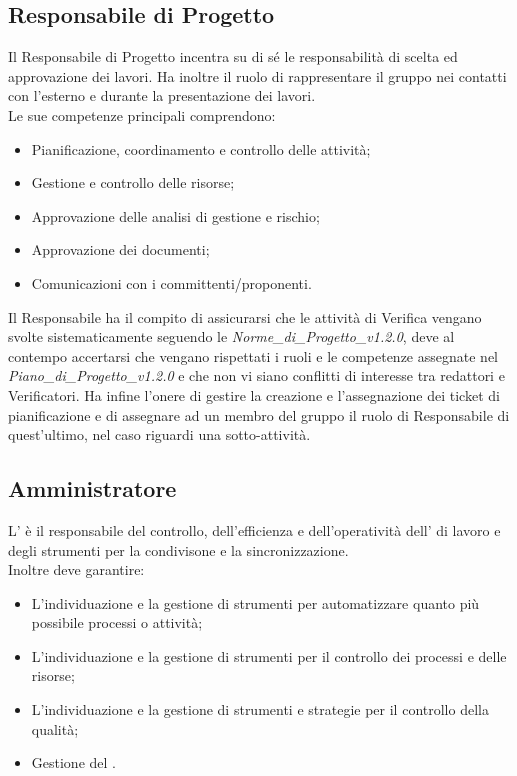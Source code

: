 \subsection{Responsabile di Progetto} %
\label{2.1}
Il Responsabile di Progetto incentra su di sé le responsabilità di scelta ed approvazione dei lavori. Ha inoltre il ruolo di rappresentare il gruppo nei contatti con l'esterno e durante la presentazione dei lavori.\\
Le sue competenze principali comprendono:
\begin{itemize}
\item Pianificazione, coordinamento e controllo delle attività;
\item Gestione e controllo delle risorse;
\item Approvazione delle analisi di gestione e rischio;
\item Approvazione dei documenti;
\item Comunicazioni con i committenti/proponenti.
\end{itemize}
Il Responsabile ha il compito di assicurarsi che le attività di Verifica vengano svolte sistematicamente seguendo le \emph{Norme\_di\_Progetto\_v1.2.0}, deve al contempo accertarsi che vengano rispettati i ruoli e le competenze assegnate nel \emph{Piano\_di\_Progetto\_v1.2.0} e che non vi siano conflitti di interesse tra redattori e Verificatori. Ha infine l'onere di gestire la creazione e l'assegnazione dei ticket di pianificazione e di assegnare ad un membro del gruppo il ruolo di Responsabile di quest'ultimo, nel caso riguardi una sotto-attività.

\subsection{Amministratore}
\label{2.2}
L' è il responsabile del controllo, dell'efficienza e dell'operatività dell' di lavoro e degli strumenti per la condivisone e la sincronizzazione.\\
Inoltre deve garantire:
\begin{itemize}
\item L'individuazione e la gestione di strumenti per automatizzare quanto più possibile processi o attività;
\item L'individuazione e la gestione di strumenti per il controllo dei processi e delle risorse;
\item L'individuazione e la gestione di strumenti e strategie per il controllo della qualità;
\item Gestione del .
\end{itemize}


